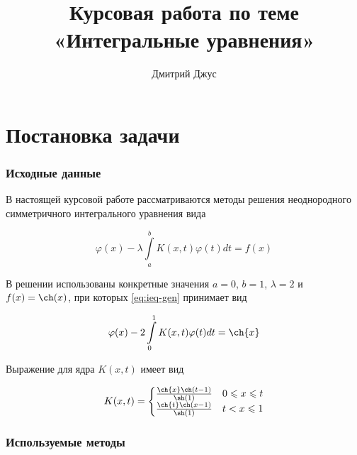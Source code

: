 \documentclass{article}
\numberwithin{equation}{section}
\renewcommand{\phi}{\varphi}
\renewcommand{\leq}{\leqslant}
\begin{document}
\author{Дмитрий Джус}
\title{Курсовая работа по теме \\
  \Huge{«Интегральные уравнения»}}
\pretitle{\begin{center}\LARGE}
\posttitle{\par\end{center}\vskip 3pc}
\maketitle
\thispagestyle{empty}

\clearpage
\tableofcontents

\clearpage
\part{Постановка задачи}

\section{Исходные данные}

В настоящей курсовой работе рассматриваются методы решения
неоднородного симметричного интегрального уравнения вида

\begin{equation}
  \label{eq:ieq-gen}
  \phi(x) - \lambda \int \limits_a^b {K(x, t) \phi(t) dt} = f(x)
\end{equation}

В решении использованы конкретные значения $a=0$, $b=1$, $\lambda = 2$
и $f(x) = \ch(x)$, при которых \eqref{eq:ieq-gen} принимает вид

\begin{equation}
  \label{eq:ieq}
  \phi(x) - 2 \int \limits_0^1 {K(x, t) \phi(t) dt} = \ch{x}
\end{equation}

Выражение для ядра $K(x,t)$ имеет вид

\begin{equation}
  \label{eq:kernel}
  K(x, t) = 
  \begin{cases}
    \frac{\ch{x} \ch(t-1)}{\sh(1)} & 0 \leq x \leq t\\
    \frac{\ch{t} \ch(x-1)}{\sh(1)} & t < x \leq 1
  \end{cases}
\end{equation}

\section{Используемые методы}
\end{document}
